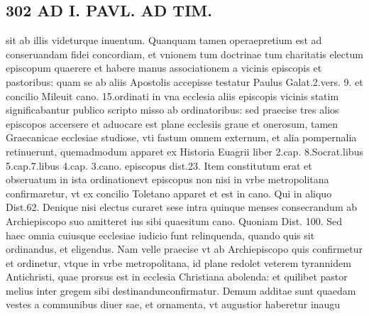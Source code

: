 \documentclass{article}
\begin{document}
\begin{pages}
\section*{302 AD I. PAVL. AD TIM. }\pstart sit ab illis videturque inuentum. Quanquam tamen operaepretium est ad conseruandam fidei concordiam, et vnionem tum doctrinae tum charitatis electum episcopum quaerere et habere manus associationem a vicinis episcopis et pastoribus: quam se ab aliis Apostolis accepisse testatur Paulus Galat.2.vers. 9. et concilio Mileuit cano. 15.ordinati in vna ecclesia aliis episcopis vicinis statim significabantur publico scripto misso ab ordinatoribus: sed praecise tres alios episcopos accersere et aduocare est plane ecclesiis graue et onerosum, tamen Graecanicae ecclesiae studiose, vti fastum omnem externum, et alia pompernalia retinuerunt, quemadmodum apparet ex Historia Euagrii liber 2.cap. 8.Socrat.libus 5.cap.7.libus 4.cap. 3.cano. episcopus dist.23.  \pend\pstart Item constitutum erat et obseruatum in ista ordinationevt episcopus non nisi in vrbe metropolitana confirmaretur, vt ex concilio Toletano apparet et est in cano. Qui in aliquo Dist.62.  \pend\pstart Denique nisi electus curaret sese intra quinque menses consecrandum ab Archiepiscopo suo amitteret ius sibi quaesitum cano. Quoniam Dist. 100. Sed haec omnia cuiusque ecclesiae iudicio funt relinquenda, quando quis sit ordinandus, et eligendus. Nam velle praecise vt ab Archiepiscopo quis confirmetur et ordinetur, vtque in vrbe metropolitana, id plane redolet veterem tyrannidem Antichristi, quae prorsus est in ecclesia Christiana abolenda: et quilibet pastor melius inter gregem sibi destinandunconfirmatur. Demum additae sunt quaedam vestes a communibus diuer sae, et ornamenta, vt augustior haberetur inaugu\pend

\end{pages}
\end{document}
